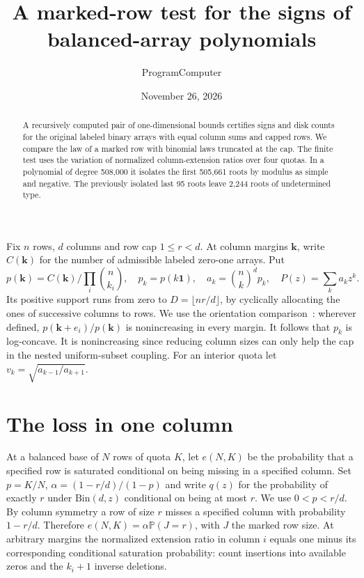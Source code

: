 \documentclass[11pt]{article}
\title{A marked-row test for the signs of balanced-array polynomials}
\author{ProgramComputer}
\date{November 26, 2026}
\newcommand{\Prob}{\mathbb P}
\begin{document}
\maketitle
\begin{abstract}
A recursively computed pair of one-dimensional bounds certifies signs and disk counts for the original labeled binary arrays with equal column sums and capped rows. We compare the law of a marked row with binomial laws truncated at the cap. The finite test uses the variation of normalized column-extension ratios over four quotas. In a polynomial of degree 508,000 it isolates the first 505,661 roots by modulus as simple and negative. The previously isolated last 95 roots leave 2,244 roots of undetermined type.
\end{abstract}

Fix $n$ rows, $d$ columns and row cap $1\le r<d$. At column margins $\mathbf k$, write $C(\mathbf k)$ for the number of admissible labeled zero-one arrays. Put
\[
p(\mathbf k)=C(\mathbf k)\big/\prod_i\binom n{k_i},\quad
p_k=p(k\mathbf1),\quad a_k=\binom nk^d p_k,\quad P(z)=\sum_k a_kz^k .
\]
Its positive support runs from zero to $D=\lfloor nr/d\rfloor$, by cyclically allocating the ones of successive columns to rows. We use the orientation comparison~\cite{orientation,kahn}: wherever defined, $p(\mathbf k+e_i)/p(\mathbf k)$ is nonincreasing in every margin. It follows that $p_k$ is log-concave. It is nonincreasing since reducing column sizes can only help the cap in the nested uniform-subset coupling. For an interior quota let $v_k=\sqrt{a_{k-1}/a_{k+1}}$.

\section{The loss in one column}
At a balanced base of $N$ rows of quota $K$, let $e(N,K)$ be the probability that a specified row is saturated conditional on being missing in a specified column. Set $p=K/N$, $\alpha=(1-r/d)/(1-p)$ and write $q(z)$ for the probability of exactly $r$ under $\mathrm{Bin}(d,z)$ conditional on being at most $r$. We use $0<p<r/d$. By column symmetry a row of size $r$ misses a specified column with probability $1-r/d$. Therefore $e(N,K)=\alpha\Prob(J=r)$, with $J$ the marked row size. At arbitrary margins the normalized extension ratio in column $i$ equals one minus its corresponding conditional saturation probability: count insertions into available zeros and the $k_i+1$ inverse deletions.
\end{document}
